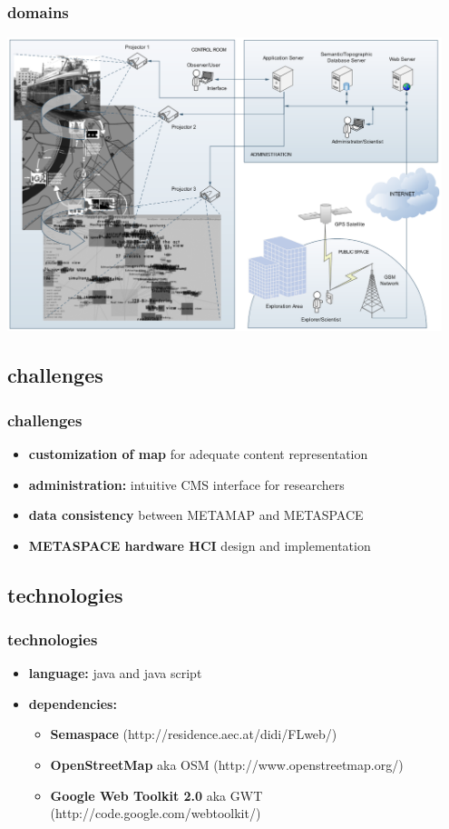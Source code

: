 \documentclass[blue]{beamer}
\begin{document}
\frame
{
\frametitle{\textbf{domains}}
\includegraphics[width=0.95\textwidth]{bin/domains/domains.png}
}


\subsection{challenges}
\frame
{
\frametitle{\textbf{challenges}}
\begin{itemize}
\item \textbf{customization of map} for adequate content representation
\item \textbf{administration:} intuitive CMS interface for researchers
\item \textbf{data consistency} between METAMAP and METASPACE
\item \textbf{METASPACE hardware HCI} design and implementation
\end{itemize}
}


\subsection{technologies}
\frame
{
\frametitle{\textbf{technologies}}
\begin{itemize}
\item \textbf{language:} java and java script
\item \textbf{dependencies:}
  \begin{itemize}
    \item \textbf{Semaspace} (http://residence.aec.at/didi/FLweb/)
    \item \textbf{OpenStreetMap} aka OSM (http://www.openstreetmap.org/)
    \item \textbf{Google Web Toolkit 2.0} aka GWT (http://code.google.com/webtoolkit/)
  \end{itemize}
\end{itemize}
}
\end{document}
